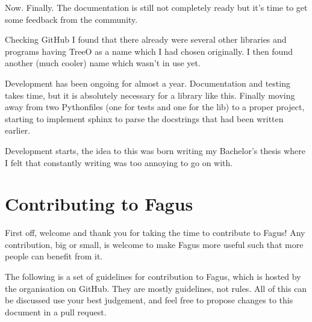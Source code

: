 \documentclass[a4paper,10pt,english]{sphinxmanual}
\begin{document}
\sphinxAtStartPar
{}

\sphinxAtStartPar
Now. Finally. The documentation is still not completely ready but it’s time to get some feedback from the community.

\sphinxAtStartPar
{}

\sphinxAtStartPar
Checking GitHub I found that there already were several other libraries and programs having TreeO as a name which I had chosen originally. I then found another (much cooler) name which wasn’t in use yet.

\sphinxAtStartPar
{}

\sphinxAtStartPar
Development has been ongoing for almost a year. Documentation and testing takes time, but it is absolutely necessary for a library like this. Finally moving away from two Python\sphinxhyphen{}files (one for tests and one for the lib) to a proper \sphinxhyphen{}project, starting to implement sphinx to parse the docstrings that had been written earlier.

\sphinxAtStartPar
{}

\sphinxAtStartPar
Development starts, the idea to this was born writing my Bachelor’s thesis where I felt that constantly writing  was too annoying to go on with.

\sphinxstepscope


\chapter{Contributing to Fagus}
\label{\detokenize{CONTRIBUTING:contributing-to-fagus}}\label{\detokenize{CONTRIBUTING::doc}}
\sphinxAtStartPar
First off, welcome and thank you for taking the time to contribute to Fagus! Any contribution, big or small, is welcome to make Fagus more useful such that more people can benefit from it.

\sphinxAtStartPar
The following is a set of guidelines for contribution to Fagus, which is hosted by the  organisation on GitHub. They are mostly guidelines, not rules. All of this can be discussed \sphinxhyphen{} use your best judgement, and feel free to propose changes to this document in a pull request.
\end{document}
